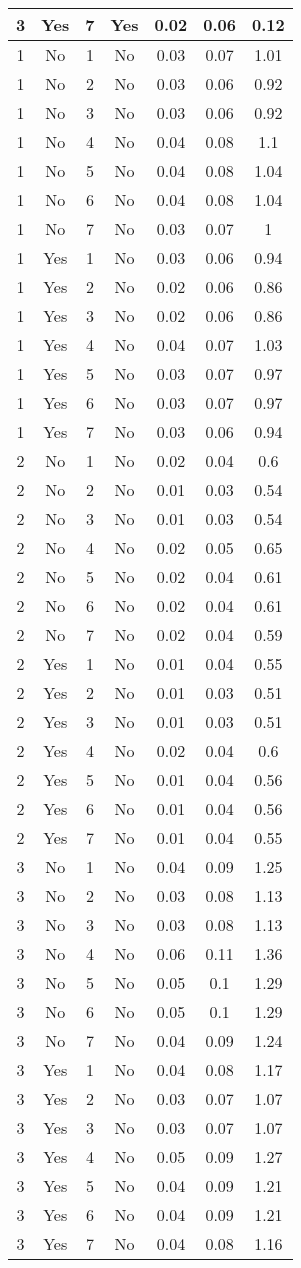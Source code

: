 \begin{table}
\begin{tabular}{|c|c|c|c|c|c|c|}
\hline 
3 & Yes & 7 & Yes & 0.02 & 0.06 & 0.12\tabularnewline
\hline 
1 & No & 1 & No & 0.03 & 0.07 & 1.01\tabularnewline
\hline 
1 & No & 2 & No & 0.03 & 0.06 & 0.92\tabularnewline
\hline 
1 & No & 3 & No & 0.03 & 0.06 & 0.92\tabularnewline
\hline 
1 & No & 4 & No & 0.04 & 0.08 & 1.1\tabularnewline
\hline 
1 & No & 5 & No & 0.04 & 0.08 & 1.04\tabularnewline
\hline 
1 & No & 6 & No & 0.04 & 0.08 & 1.04\tabularnewline
\hline 
1 & No & 7 & No & 0.03 & 0.07 & 1\tabularnewline
\hline 
1 & Yes & 1 & No & 0.03 & 0.06 & 0.94\tabularnewline
\hline 
1 & Yes & 2 & No & 0.02 & 0.06 & 0.86\tabularnewline
\hline 
1 & Yes & 3 & No & 0.02 & 0.06 & 0.86\tabularnewline
\hline 
1 & Yes & 4 & No & 0.04 & 0.07 & 1.03\tabularnewline
\hline 
1 & Yes & 5 & No & 0.03 & 0.07 & 0.97\tabularnewline
\hline 
1 & Yes & 6 & No & 0.03 & 0.07 & 0.97\tabularnewline
\hline 
1 & Yes & 7 & No & 0.03 & 0.06 & 0.94\tabularnewline
\hline 
2 & No & 1 & No & 0.02 & 0.04 & 0.6\tabularnewline
\hline 
2 & No & 2 & No & 0.01 & 0.03 & 0.54\tabularnewline
\hline 
2 & No & 3 & No & 0.01 & 0.03 & 0.54\tabularnewline
\hline 
2 & No & 4 & No & 0.02 & 0.05 & 0.65\tabularnewline
\hline 
2 & No & 5 & No & 0.02 & 0.04 & 0.61\tabularnewline
\hline 
2 & No & 6 & No & 0.02 & 0.04 & 0.61\tabularnewline
\hline 
2 & No & 7 & No & 0.02 & 0.04 & 0.59\tabularnewline
\hline 
2 & Yes & 1 & No & 0.01 & 0.04 & 0.55\tabularnewline
\hline 
2 & Yes & 2 & No & 0.01 & 0.03 & 0.51\tabularnewline
\hline 
2 & Yes & 3 & No & 0.01 & 0.03 & 0.51\tabularnewline
\hline 
2 & Yes & 4 & No & 0.02 & 0.04 & 0.6\tabularnewline
\hline 
2 & Yes & 5 & No & 0.01 & 0.04 & 0.56\tabularnewline
\hline 
2 & Yes & 6 & No & 0.01 & 0.04 & 0.56\tabularnewline
\hline 
2 & Yes & 7 & No & 0.01 & 0.04 & 0.55\tabularnewline
\hline 
3 & No & 1 & No & 0.04 & 0.09 & 1.25\tabularnewline
\hline 
3 & No & 2 & No & 0.03 & 0.08 & 1.13\tabularnewline
\hline 
3 & No & 3 & No & 0.03 & 0.08 & 1.13\tabularnewline
\hline 
3 & No & 4 & No & 0.06 & 0.11 & 1.36\tabularnewline
\hline 
3 & No & 5 & No & 0.05 & 0.1 & 1.29\tabularnewline
\hline 
3 & No & 6 & No & 0.05 & 0.1 & 1.29\tabularnewline
\hline 
3 & No & 7 & No & 0.04 & 0.09 & 1.24\tabularnewline
\hline 
3 & Yes & 1 & No & 0.04 & 0.08 & 1.17\tabularnewline
\hline 
3 & Yes & 2 & No & 0.03 & 0.07 & 1.07\tabularnewline
\hline 
3 & Yes & 3 & No & 0.03 & 0.07 & 1.07\tabularnewline
\hline 
3 & Yes & 4 & No & 0.05 & 0.09 & 1.27\tabularnewline
\hline 
3 & Yes & 5 & No & 0.04 & 0.09 & 1.21\tabularnewline
\hline 
3 & Yes & 6 & No & 0.04 & 0.09 & 1.21\tabularnewline
\hline 
3 & Yes & 7 & No & 0.04 & 0.08 & 1.16\tabularnewline
\hline 
\end{tabular}
\end{table}

